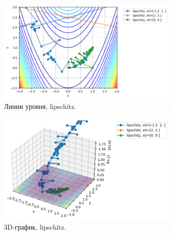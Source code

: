 \documentclass[a4paper,12pt]{article}
\begin{document}
\begin{figure}[H]
    \centering
    \includegraphics[width=0.8\textwidth]{images/task2/plot_levels_2_3_lipschitz.png}
    \caption{Линии уровня, lipschitz.}
\end{figure}
\begin{figure}[H]
    \centering
    \includegraphics[width=0.8\textwidth]{images/task2/plot_3d_2_3_lipschitz.png}
    \caption{3D-график, lipschitz.}
\end{figure}
\end{document}
